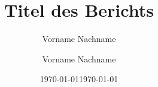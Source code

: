 \documentclass[a4paper]{article}
\author{Vorname Nachname}
\date{\today}
\begin{document}
	
	\title{Titel des Berichts}
	\author{Vorname Nachname}
	\date{\today}
	\maketitle
	
	\tableofcontents
	
	
	
	
	
	
\end{document}
